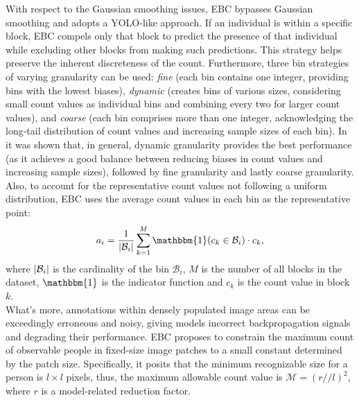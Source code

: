 With respect to the Gaussian smoothing issues, EBC bypasses Gaussian smoothing and adopts a YOLO-like approach. If an individual is within a specific block, EBC compels only that block to predict the presence of that individual while excluding other blocks from making such predictions. This strategy helps preserve the inherent discreteness of the count. Furthermore, three bin strategies of varying granularity can be used: \textit{fine} (each bin contains one integer, providing bins with the lowest biases), \textit{dynamic} (creates bins of various sizes, considering small count values as individual bins and combining every two for larger count values), and \textit{coarse} (each bin comprises more than one integer, acknowledging the long-tail distribution of count values and increasing sample sizes of each bin). In \cite{CLIP} it was shown that, in general, dynamic granularity provides the best performance (as it achieves a good balance between reducing biases in count values and increasing sample sizes), followed by fine granularity and lastly coarse granularity. Also, to account for the representative count values not following a uniform distribution, EBC uses the average count values in each bin as the representative point:
$$ a_i = \frac{1}{\abs{\mathcal{B}_i}} \sum_{k=1}^{M}{\mathbbm{1}(c_k \in \mathcal{B}_i) \cdot c_k} , $$
where $\lvert\mathcal{B}_i\rvert$ is the cardinality of the bin $\mathcal{B}_i$, $M$ is the number of all blocks in the dataset, $\mathbbm{1}$ is the indicator function and $c_k$ is the count value in block $k$.\\

What's more, annotations within densely populated image areas can be exceedingly erroneous and noisy, giving models incorrect backpropagation signals and degrading their performance. EBC proposes to constrain the maximum count of observable people in fixed-size image patches to a small constant determined by the patch size. Specifically, it posits that the minimum recognizable size for a person is $l \times l$ pixels, thus, the maximum allowable count value is $\mathcal{M} = (r//l)^2$, where $r$ is a model-related reduction factor.\\

